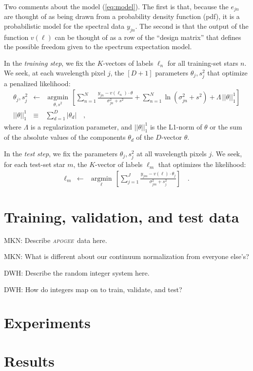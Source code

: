\documentclass[12pt,preprint]{aastex}
\newcommand{\project}[1]{\textsl{#1}}
\newcommand{\apogee}{\project{\textsc{apogee}}}
\newcommand{\argmin}[1]{\underset{#1}{\operatorname{argmin}}\,}
\begin{document}
Two comments about the model (\ref{eq:model}).
The first is that, because the $e_{jn}$ are thought of as being drawn from a 
probability density function (pdf), it is a probabilistic model for the spectral
data $y_{jn}$.
The second is that the output of the function $v(\ell)$ can be thought
of as a row of the ``design matrix'' that defines the possible freedom
given to the spectrum expectation model.

In the \emph{training step}, we fix the $K$-vectors of labels $\ell_n$
for all training-set stars $n$.
We seek, at each wavelength pixel $j$, the $[D+1]$ parameters
$\theta_j,s^2_j$ that optimize a penalized likelihood:
\begin{eqnarray}
  \theta_j,s^2_j &\leftarrow& \argmin{\theta,s^2}\left[
    \sum_{n=1}^N \frac{y_{jn}-v(\ell_n)\cdot\theta}{\sigma^2_{jn}+s^2}
    + \sum_{n=1}^N \ln(\sigma^2_{jn}+s^2)
    + \Lambda\,||\theta||_1^1
    \right]
  \\
  ||\theta||_1^1 &\equiv& \sum_{d=1}^D |\theta_d|
  \quad ,
\end{eqnarray}
where $\Lambda$ is a regularization parameter, and $||\theta||_1^1$ is
the L1-norm of $\theta$ or the sum of the absolute values of the
components $\theta_d$ of the $D$-vector $\theta$.

In the \emph{test step}, we fix the parameters $\theta_j,s^2_j$ at all
wavelength pixels $j$.
We seek, for each test-set star $m$, the $K$-vector of labels $\ell_m$
that optimizes the likelihood:
\begin{eqnarray}
  \ell_m &\leftarrow& \argmin{\ell}\left[
    \sum_{j=1}^J \frac{y_{jm}-v(\ell)\cdot\theta_j}{\sigma^2_{jm}+s^2_j}
    \right]
  \quad .
\end{eqnarray}

\section{Training, validation, and test data}

MKN: Describe \apogee\ data here.

MKN: What is different about our continuum normalization from everyone else's?

DWH: Describe the random integer system here.

DWH: How do integers map on to train, validate, and test?

\section{Experiments}

\section{Results}
\end{document}
